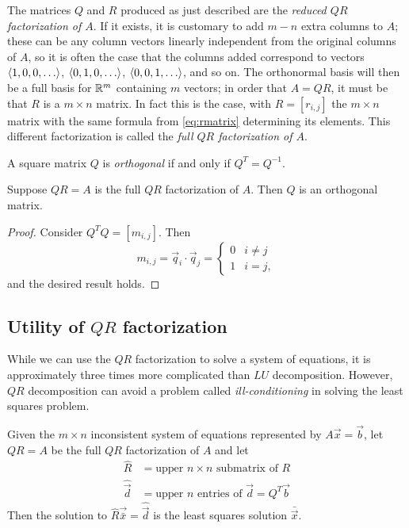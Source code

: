 \documentclass[m3380-lec-main.tex]{subfiles}
\begin{document}
The matrices $Q$ and $R$ produced as just described are the \emph{reduced $QR$ factorization of $A$}. If it exists, it is customary to add $m-n$ extra columns to $A$; these can be any column vectors linearly independent from the original columns of $A$, so it is often the case that the columns added correspond to vectors $\left\langle1,0,0,\ldots\right\rangle$, $\left\langle0,1,0,\ldots\right\rangle$, $\left\langle0,0,1,\ldots\right\rangle$, and so on. The orthonormal basis will then be a full basis for $\mathbb{R}^m$ containing $m$ vectors; in order that $A=QR$, it must be that $R$ is a $m\times n$ matrix. In fact this is the case, with $R=[r_{i,j}]$ the $m\times n$ matrix with the same formula from \autoref{eq:rmatrix} determining its elements. This different factorization is called the \emph{full $QR$ factorization of $A$}.

\begin{defn} A square matrix $Q$ is \emph{orthogonal} if and only if $Q^T=Q^{-1}$.
\end{defn}

\begin{thm} Suppose $QR=A$ is the full $QR$ factorization of $A$. Then $Q$ is an orthogonal matrix.
\end{thm}
\begin{proof}
Consider $Q^TQ = [m_{i,j}]$. Then 
\[m_{i,j} = \vec{q}_i\cdot\vec{q}_j = \begin{cases}0&i\neq j\\1&i=j,\end{cases}\] and the desired result holds.
\end{proof}

\subsection{Utility of $QR$ factorization}
While we can use the $QR$ factorization to solve a system of equations, it is approximately three times more complicated than $LU$ decomposition. However, $QR$ decomposition can avoid a problem called \emph{ill-conditioning} in solving the least squares problem.

\begin{alg}
Given the $m\times n$ inconsistent system of equations represented by $A\vec{x}=\vec{b}$, let $QR=A$ be the full $QR$ factorization of $A$ and let
\begin{align*}
\hat{R} &= \text{upper $n\times n$ submatrix of $R$} \\
\hat{\vec{d}} &= \text{upper $n$ entries of }\vec{d}=Q^T\vec{b}
\end{align*}
Then the solution to $\hat{R}\vec{\bar{x}}=\hat{\vec{d}}$ is the least squares solution $\bar{\vec{x}}$.
\end{alg}
\end{document}
